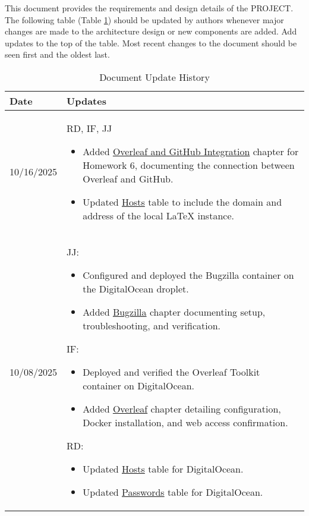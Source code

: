 This document provides the requirements and design details of the
PROJECT.  The following table (Table \ref{Table::UpdateHistory}) should be
updated by authors whenever major changes are made to the architecture
design or new components are added. Add updates to the top of the table.  
Most recent changes to the document should be seen first and the oldest 
last.

\begin{longtable}{|l||p{13.5cm}|}
\caption{Document Update History \label{Table::UpdateHistory}}\\
\hline
\textbf{Date} & \textbf{Updates} \\
\hline 
\endhead

10/16/2025 & RD, IF, JJ
\begin{itemize}[topsep=0pt,itemsep=0pt,parsep=0pt,partopsep=0pt,leftmargin=12pt]
    \item Added \hyperref[Chapter::Overleaf and Github Integration]{Overleaf and GitHub Integration} chapter for Homework 6, documenting the connection between Overleaf and GitHub.
    \item Updated \hyperref[Chapter::Hosts]{Hosts} table to include the domain and address of the local LaTeX instance.
\end{itemize}
\\ \hline

10/08/2025 & 
{JJ:}
\begin{itemize}[topsep=0pt,itemsep=0pt,parsep=0pt,partopsep=0pt,leftmargin=12pt]
  \item Configured and deployed the Bugzilla container on the DigitalOcean droplet.
  \item Added \hyperref[Chapter::Bugzilla]{Bugzilla} chapter documenting setup, troubleshooting, and verification.
\end{itemize}

{IF:}
\begin{itemize}[topsep=0pt,itemsep=0pt,parsep=0pt,partopsep=0pt,leftmargin=12pt]
  \item Deployed and verified the Overleaf Toolkit container on DigitalOcean.
  \item Added \hyperref[Chapter::Overleaf]{Overleaf} chapter detailing configuration, Docker installation, and web access confirmation.
\end{itemize}

{RD:}
\begin{itemize}[topsep=0pt,itemsep=0pt,parsep=0pt,partopsep=0pt,leftmargin=12pt]
  \item Updated \hyperref[Chapter::Hosts]{Hosts} table for DigitalOcean.
  \item Updated \hyperref[Chapter::Passwords]{Passwords} table for DigitalOcean.


\end{itemize}
\end{longtable}

